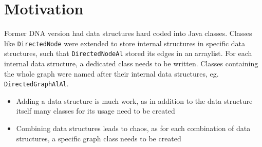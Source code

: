 \section{Motivation}

Former DNA version had data structures hard coded into Java classes. Classes like
\texttt{DirectedNode} were extended to store internal structures in specific data
structures, such that \texttt{DirectedNodeAl} stored its edges in an arraylist. For each
internal data structure, a dedicated class needs to be written. Classes containing the
whole graph were named after their internal data structures, eg.
\texttt{DirectedGraphAlAl}.

\begin{itemize}
	\item Adding a data structure is much work, as in addition to the data structure
		itself many classes for its usage need to be created
	\item Combining data structures leads to chaos, as for each combination of
		data structures, a specific graph class needs to be created
\end{itemize}


